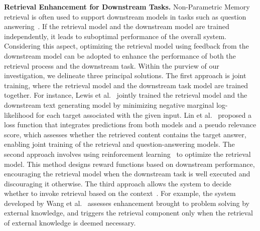 \documentclass[journal,hideappendix]{vgtc}
\newenvironment{j_itemize}{
\begin{itemize}[]
  \setlength{\itemsep}{3pt}
  \setlength{\parskip}{0pt}
  \setlength{\parsep}{0pt}
}{\end{itemize}}
\begin{document}
\begin{j_itemize}
    \item[$\bullet$] \textbf{Retrieval Enhancement for Downstream Tasks.} Non-Parametric Memory retrieval is often used to support downstream models in tasks such as question answering~\cite{qa2020karpukhin,xixin2022gmtkbqa,yang2023care,luo2023chatkbqa}. If the retrieval model and the downstream model are trained independently, it leads to suboptimal performance of the overall system. Considering this aspect, optimizing the retrieval model using feedback from the downstream model can be adopted to enhance the performance of both the retrieval process and the downstream task. Within the purview of our investigation, we delineate three principal solutions. The first approach is joint training, where the retrieval model and the downstream task model are trained together. For instance, Lewis et al.~\cite{lewis2020retrieval} jointly trained the retrieval model and the downstream text generating model by minimizing negative marginal log-likelihood for each target associated with the given input. Lin et al.~\cite{lin2022okvqa} proposed a loss function that integrates predictions from both models and a pseudo relevance score, which assesses whether the retrieved content contains the target answer, enabling joint training of the retrieval and question-answering models. 
    The second approach involves using reinforcement learning~\cite{kaelbling1996reinforcement,kulkarni2024reinforcement} to optimize the retrieval model. This method designs reward functions based on downstream performance, encouraging the retrieval model when the downstream task is well executed and discouraging it otherwise.
    The third approach allows the system to decide whether to invoke retrieval based on the context~\cite{asai2023self,wang2023skr,kulkarni2024reinforcement}. For example, the system developed by Wang et al.~\cite{wang2023skr} assesses enhancement brought to problem solving by external knowledge, and triggers the retrieval component only when the retrieval of external knowledge is deemed necessary.


\end{j_itemize}
\end{document}
